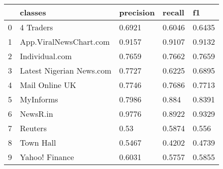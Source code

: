\begin{tabular}{lllll}
\toprule
{} &                   classes & precision &  recall &      f1 \\
\midrule
0 &                 4 Traders &    0.6921 &  0.6046 &  0.6435 \\
1 &    App.ViralNewsChart.com &    0.9157 &  0.9107 &  0.9132 \\
2 &            Individual.com &    0.7659 &  0.7662 &  0.7659 \\
3 &  Latest Nigerian News.com &    0.7727 &  0.6225 &  0.6895 \\
4 &            Mail Online UK &    0.7746 &  0.7686 &  0.7713 \\
5 &                 MyInforms &    0.7986 &   0.884 &  0.8391 \\
6 &                  NewsR.in &    0.9776 &  0.8922 &  0.9329 \\
7 &                   Reuters &      0.53 &  0.5874 &   0.556 \\
8 &                 Town Hall &    0.5467 &  0.4202 &  0.4739 \\
9 &            Yahoo! Finance &    0.6031 &  0.5757 &  0.5855 \\
\bottomrule
\end{tabular}
